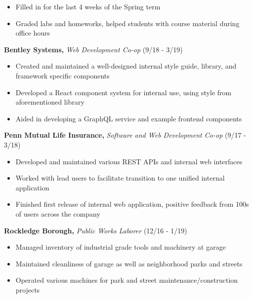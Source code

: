\documentclass[10pt]{article}
\begin{document}
\vspace{-\topsep}
\begin{itemize}
    \setlength\itemsep{-0.5em}
    \item Filled in for the last 4 weeks of the Spring term
    \item Graded labs and homeworks, helped students with course
        material during office hours
\end{itemize}

\vspace{-0.5em}
\textbf{Bentley Systems,}
\emph{Web Development Co-op}
(9/18 - 3/19)

\vspace{-\topsep}
\begin{itemize}
    \setlength\itemsep{-0.5em}
    \item Created and maintained a well-designed internal style
        guide, library, and framework specific components
    \item Developed a React component system for internal use, using style
        from aforementioned library
    \item Aided in developing a GraphQL service and example frontend
        components
\end{itemize}

\vspace{-0.5em}
\textbf{Penn Mutual Life Insurance,}
\emph{Software and Web Development Co-op}
(9/17 - 3/18)

\vspace{-\topsep}
\begin{itemize}
    \setlength\itemsep{-0.5em}
    \item Developed and maintained various REST APIs and
        internal web interfaces
    \item Worked with lead users to facilitate transition to one unified
        internal application
    \item Finished first release of internal web application,
        positive feedback from 100s of users across the company
\end{itemize}

\vspace{-0.5em}
\textbf{Rockledge Borough,}
\emph{Public Works Laborer}
(12/16 - 1/19)

\vspace{-\topsep}
\begin{itemize}
    \setlength\itemsep{-0.5em}
    \item Managed inventory of industrial grade tools and machinery
        at garage
    \item Maintained cleanliness of garage as well as neighborhood
        parks and streets
    \item Operated various machines for park and street
        maintenance/construction projects
\end{itemize}
\end{document}
